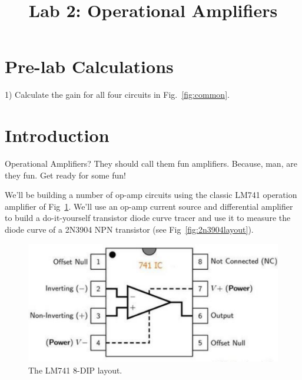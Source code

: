 \documentclass[12pt]{article}
\begin{document}

\title{Lab 2:  Operational Amplifiers}

\maketitle

\section{Pre-lab Calculations}
\noindent



1) Calculate the gain for all four circuits in Fig.~\ref{fig:common}. \\

\section{Introduction}

Operational Amplifiers?  They should call them fun amplifiers.  Because, man, are they fun.  Get ready for some fun!

We'll be building a number of op-amp circuits using the classic LM741 operation amplifier of Fig~\ref{fig:lm741layout}.  We'll use an op-amp current source and differential amplifier to build a do-it-yourself transistor diode curve tracer and use it to measure the diode curve of a 2N3904 NPN transistor (see Fig~\ref{fig:2n3904layout}).


\begin{figure}[htbp]
\begin{center}
\includegraphics[height=0.15\textheight]{figs/lm741.pdf} 
\end{center}
\caption{The LM741 8-DIP layout.}
\label{fig:lm741layout}
\end{figure}
\end{document}
